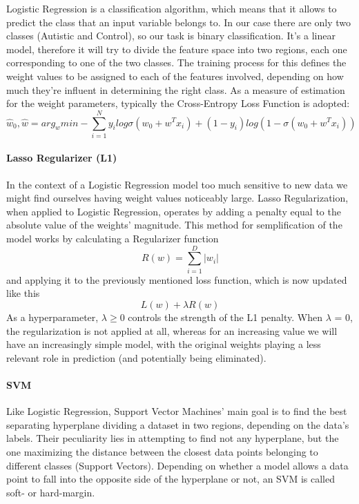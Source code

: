 \documentclass{article}
\begin{document}
Logistic Regression is a classification algorithm, which means that it allows to predict the class that an input variable belongs to. In our case there are only two classes (Autistic and Control), so our task is binary classification. It's a linear model, therefore it will try to divide the feature space into two regions, each one corresponding to one of the two classes. The training process for this defines the weight values to be assigned to each of the features involved, depending on how much they're influent in determining the right class. As a measure of estimation for the weight parameters, typically the Cross-Entropy Loss Function is adopted:
$$
\hat{w}_0, \hat{w} = arg_w min -\sum_{i=1}^{N} y_i log\sigma(w_0 + w^T x_i) +
(1 - y_i)log(1-\sigma(w_0 + w^T x_i))
$$

\paragraph{Lasso Regularizer (L1)}

In the context of a Logistic Regression model too much sensitive to new data we might find ourselves having weight values noticeably large. Lasso Regularization, when applied to Logistic Regression, operates by adding a penalty equal to the absolute value of the weights' magnitude. This method for semplification of the model works by calculating a Regularizer function
$$
R(w) = \sum_{i=1}^{D} |w_i|
$$
and applying it to the previously mentioned loss function, which is now updated like this
$$
L(w) + \lambda R(w)
$$
As a hyperparameter, $\lambda \ge 0$ controls the strength of the L1 penalty.  When $\lambda$ = 0, the regularization is not applied at all, whereas for an increasing value we will have an increasingly simple model, with the original weights playing a less relevant role in prediction (and potentially being eliminated).


\paragraph{SVM}

Like Logistic Regression, Support Vector Machines' main goal is to find the best separating hyperplane dividing a dataset in two regions, depending on the data's labels. Their peculiarity lies in attempting to find not any hyperplane, but the one maximizing the distance between the closest data points belonging to different classes (Support Vectors). Depending on whether a model allows a data point to fall into the opposite side of the hyperplane or not, an SVM is called soft- or hard-margin.
\end{document}
